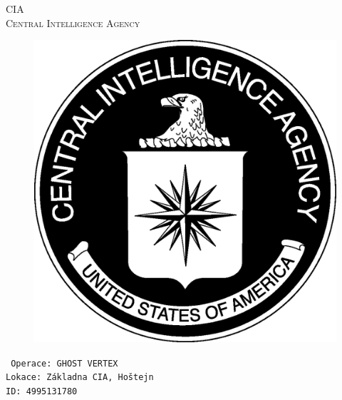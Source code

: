 \documentclass[a4paper, \fontheight]{article}
\begin{document}
	\begin{titlepage}
		\begin{center}		
			\textsc{{\fontsize{80}{0}\selectfont CIA}\\[2em]
				\Huge Central Intelligence Agency\\[2.5em]}
				
			\begin{figure}[H]
				\centering
				\includegraphics[scale=0.6]{sources/CIA_logo.eps}
			\end{figure}
		\end{center}	
		\vfill
		\noindent
		\texttt{\LARGE
				Operace: GHOST VERTEX\\[0.4em]
				Lokace: Základna CIA, Hoštejn\\[0.4em]
				ID: 4995131780}	
\end{titlepage} 
\end{document}
